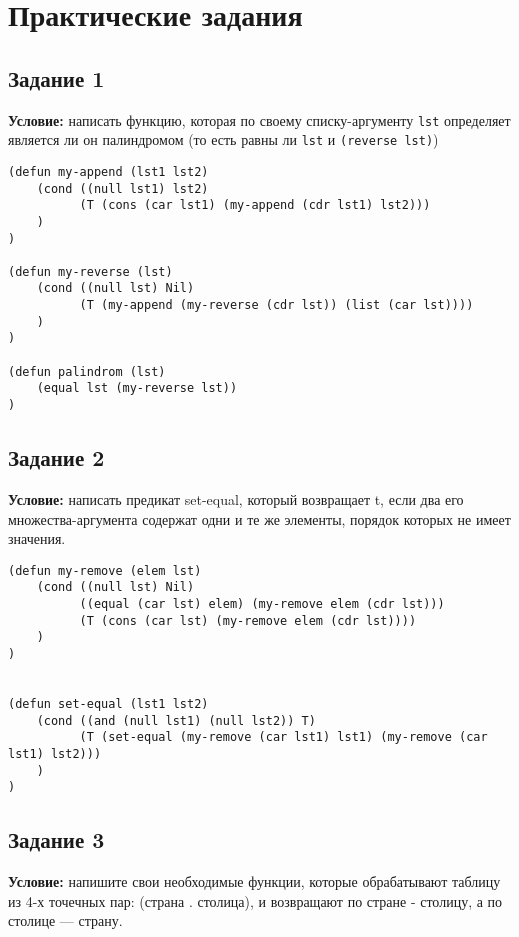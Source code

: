 \chapter{Практические задания}

\section{Задание 1}

\textbf{Условие:} написать функцию, которая по своему списку-аргументу \texttt{lst} определяет является ли он палиндромом (то есть равны ли \texttt{lst} и \texttt{(reverse lst)})

\begin{lstlisting}
(defun my-append (lst1 lst2)
    (cond ((null lst1) lst2)
          (T (cons (car lst1) (my-append (cdr lst1) lst2)))
    )
)

(defun my-reverse (lst)
    (cond ((null lst) Nil)
          (T (my-append (my-reverse (cdr lst)) (list (car lst))))
    )
)

(defun palindrom (lst)
    (equal lst (my-reverse lst))
)
\end{lstlisting}


\section{Задание 2}

\textbf{Условие:} написать предикат set-equal, который возвращает t, если два его множества-аргумента содержат одни и те же элементы, порядок которых не имеет значения.

\begin{lstlisting}
(defun my-remove (elem lst)
    (cond ((null lst) Nil)
          ((equal (car lst) elem) (my-remove elem (cdr lst)))
          (T (cons (car lst) (my-remove elem (cdr lst))))
    )
)


(defun set-equal (lst1 lst2)
    (cond ((and (null lst1) (null lst2)) T)
          (T (set-equal (my-remove (car lst1) lst1) (my-remove (car lst1) lst2)))
    )
)
\end{lstlisting}


\section{Задание 3}

\textbf{Условие:} напишите свои необходимые функции, которые обрабатывают таблицу из 4-х точечных пар: (страна . столица), и возвращают по стране - столицу, а по столице — страну.


